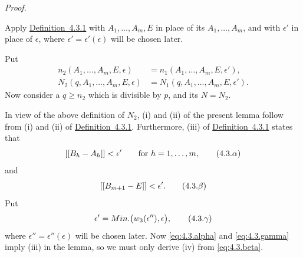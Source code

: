 \documentclass[b5paper,twoside]{article}
\newcommand{\defref}[2]{\hyperref[#1]{\mbox{Definition~#2}}}
\theoremstyle{mvnplain}
\renewenvironment{proof}[1][Proof]{%
  \par\addvspace{0.35\baselineskip}%
  \noindent\textit{#1.}\ \normalfont\ignorespaces
}{%
  \par\addvspace{0.35\baselineskip}%
}
\newcommand{\N}{\mathbf N}
\newcommand{\Metric}[1]{\left[\!\left[#1\right]\!\right]}
\def\N{N}%
\def\Metric#1{[[#1]]}%
\def\operatorname#1{#1}%
\begin{document}
\begin{proof}
Apply \defref{def:4.3.1}{4.3.1} with \(A_1,\ldots,A_m,E\) in place of its
\(A_1,\ldots,A_m\), and with \(\epsilon'\) in place of \(\epsilon\), where
\(\epsilon'=\epsilon'(\epsilon)\) will be chosen later.

Put
\[
\begin{aligned}
n_2(A_1,\ldots,A_m,E,\epsilon)
  &=n_1(A_1,\ldots,A_m,E,\epsilon'),\\
\N_2(q,A_1,\ldots,A_m,E,\epsilon)
  &=\N_1(q,A_1,\ldots,A_m,E,\epsilon').
\end{aligned}
\]
Now consider a \(q\ge n_2\) which is divisible by \(p\), and its
\(\N=\N_2\).

In view of the above definition of \(\N_2\), (i) and (ii) of the present
lemma follow from (i) and (ii) of \defref{def:4.3.1}{4.3.1}. Furthermore,
(iii) of \defref{def:4.3.1}{4.3.1} states that
\begin{equation}\label{eq:4.3.alpha}
  \Metric{B_h-A_h}<\epsilon'\qquad\text{for }h=1,\ldots,m,
  \tag{4.3.\ensuremath{\alpha}}
\end{equation}
and
\begin{equation}\label{eq:4.3.beta}
  \Metric{B_{m+1}-E}<\epsilon'.
  \tag{4.3.\ensuremath{\beta}}
\end{equation}
Put
\begin{equation}\label{eq:4.3.gamma}
  \epsilon'=\operatorname {Min.}\bigl(w_3(\epsilon''),\epsilon\bigr),
  \tag{4.3.\ensuremath{\gamma}}
\end{equation}
where \(\epsilon''=\epsilon''(\epsilon)\) will be chosen later. Now
\eqref{eq:4.3.alpha} and \eqref{eq:4.3.gamma} imply (iii) in the lemma, so
we must only derive (iv) from \eqref{eq:4.3.beta}.


\end{proof}
\end{document}

